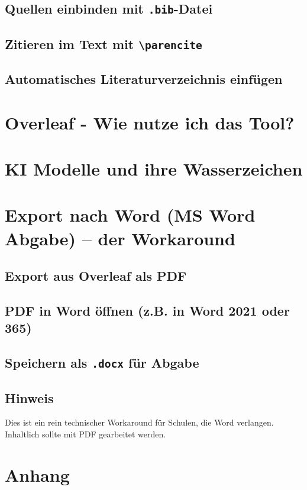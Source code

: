 \documentclass[11pt,a4paper]{article}
\begin{document}
\subsection{Quellen einbinden mit \texttt{.bib}-Datei}
\subsection{Zitieren im Text mit \texttt{\textbackslash parencite}}
\subsection{Automatisches Literaturverzeichnis einfügen}

\section{Overleaf - Wie nutze ich das Tool?}

\section{KI Modelle und ihre Wasserzeichen}

\section{Export nach Word (MS Word Abgabe) – der Workaround}
\subsection{Export aus Overleaf als PDF}
\subsection{PDF in Word öffnen (z.B. in Word 2021 oder 365)}
\subsection{Speichern als \texttt{.docx} für Abgabe}
\subsection*{Hinweis}
Dies ist ein rein technischer Workaround für Schulen, die Word verlangen. Inhaltlich sollte mit PDF gearbeitet werden.



\cleardoublepage
\section{Anhang}
\end{document}
